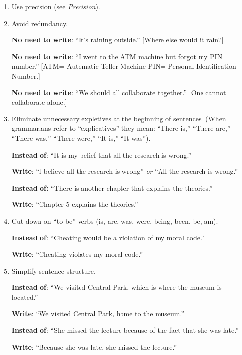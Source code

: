 \begin{enumerate}
 
\item Use precision (see \emph{Precision}).
 
\item Avoid redundancy. 
 
\textbf{No need to write}: ``It's raining outside.''
[Where else would it rain?]
 
\textbf{No need to write}: ``I went to the ATM machine but forgot my PIN number.'' 
 [ATM= Automatic Teller Machine PIN= Personal Identification Number.]
 
\textbf{No need to write}: ``We should all collaborate together.'' 
[One cannot collaborate alone.]
 
 \item Eliminate unnecessary expletives at the beginning of sentences. (When grammarians refer to ``explicatives'' they mean: ``There is,'' ``There are,'' ``There was,'' ``There were,'' ``It is,'' ``It was''). 
 
  \textbf{Instead of}: ``It is my belief that all the research is wrong.''
 
                  	\textbf{Write}:		``I believe all the research is wrong'' \emph{or} ``All the research is wrong.''
 
 
             	\textbf{Instead of:}    	``There is another chapter that explains the theories.''
 
                    	\textbf{Write}:       	``Chapter 5 explains the theories.''
 
 
\item Cut down on ``to be'' verbs (is, are, was, were, being, been, be, am).
 
      	\textbf{Instead of}:  	``Cheating would be a violation of my moral code.''
 
      	\textbf{Write}:          	``Cheating violates my moral code.''
 
 
\item Simplify sentence structure.
 
    	\textbf{Instead of}: 	``We visited Central Park, which is where the museum is located.''
 
    	\textbf{Write}:          	``We visited Central Park, home to the museum.''
 
    	\textbf{Instead of}: ``She missed the lecture because of the fact that she was late.''
 
    	\textbf{Write}: ``Because she was late, she missed the lecture.''
 

\end{enumerate}
